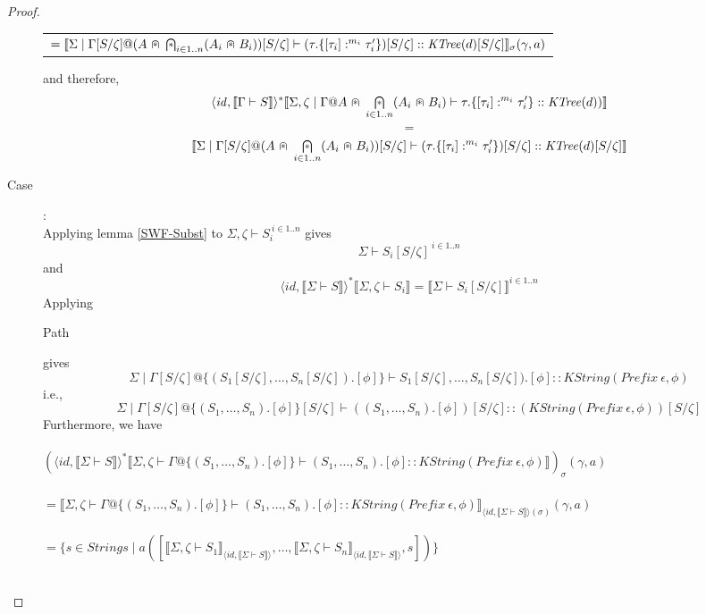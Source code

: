 \documentclass{article}
\newcommand{\sem}[1]{\llbracket #1 \rrbracket}
\newcommand{\capdot}{~\stackinset{c}{}{c}{}{\scalebox{0.8}{$\ast$}}{$\cap$}~}
\newcommand{\bigcapdot}{\mathop{\stackinset{c}{}{c}{}{\scalebox{0.8}{$\ast$}}{$\bigcap$}}}
\begin{document}
\begin{proof}
\begin{description}
\begin{center}
\begin{tabular}{l}
$= \sem{\Sigma \mid \Gamma[S/\zeta] @ (A \capdot \bigcapdot_{i \in 1..n} (A_i \capdot B_i))[S/\zeta] \vdash (\tau.\{ [\tau_i] :^{m_i} \tau'_i \})[S/\zeta] :: \mathit{KTree}(d)[S/\zeta]  }_{\sigma}(\gamma,a)  $
\end{tabular}
\end{center}
and therefore,
$$\langle \mathit{id}, \sem{\Gamma \vdash S} \rangle^* \sem{\Sigma,\zeta \mid \Gamma @ A \capdot \bigcapdot_{i \in 1..n} (A_i \capdot B_i) \vdash \tau.\{ [\tau_i] :^{m_i} \tau_i' \} :: \mathit{KTree}(d))}$$ $$=$$ $$\sem{\Sigma \mid \Gamma[S/\zeta] @ (A \capdot \bigcapdot_{i \in 1..n} (A_i \capdot B_i))[S/\zeta] \vdash (\tau.\{ [\tau_i] :^{m_i} \tau'_i \})[S/\zeta] :: \mathit{KTree}(d)[S/\zeta]}$$
\item[Case \sc{Path}]:~\\
Applying lemma \ref{SWF-Subst} to $\Sigma,\zeta \vdash S_i^{~i \in 1..n}$ gives $$\Sigma \vdash S_i[S/\zeta]^{~i \in 1..n}$$ and $$\langle \mathit{id}, \sem{\Sigma \vdash S} \rangle^* \sem{\Sigma, \zeta \vdash S_i} = \sem{\Sigma \vdash S_i[S/\zeta]}^{i \in 1..n}$$ 
Applying \begin{sc}Path\end{sc} gives 
$$\Sigma \mid \Gamma[S/\zeta] @ \{ (S_1[S/\zeta],\ldots,S_n[S/\zeta]).[\phi] \} \vdash S_1[S/\zeta],\ldots,S_n[S/\zeta]).[\phi] :: \mathit{KString}(\mathit{Prefix}~\epsilon,\phi)$$
i.e.,
$$\Sigma \mid \Gamma[S/\zeta] @ \{ (S_1,\ldots,S_n).[\phi] \}[S/\zeta] \vdash ((S_1,\ldots,S_n).[\phi])[S/\zeta] :: (\mathit{KString}(\mathit{Prefix}~\epsilon,\phi))[S/\zeta]$$
Furthermore, we have\\~\\
$(\langle \mathit{id}, \sem{\Sigma \vdash S} \rangle^* \sem{\Sigma,\zeta \vdash \Gamma @ \{ (S_1, \ldots, S_n).[\phi] \} \vdash (S_1, \ldots, S_n).[\phi] :: \mathit{KString(\mathit{Prefix}~\epsilon,\phi)} })_{\sigma}(\gamma,a)$\\~\\
$= \sem{\Sigma,\zeta \vdash \Gamma @ \{ (S_1, \ldots, S_n).[\phi] \} \vdash (S_1, \ldots, S_n).[\phi] :: \mathit{KString(\mathit{Prefix}~\epsilon,\phi)}}_{\langle \mathit{id}, \sem{\Sigma \vdash S} \rangle(\sigma)}(\gamma,a)$\\~\\
$= \{ s \in \mathit{Strings} \mid a([\sem{\Sigma,\zeta \vdash S_1}_{\langle \mathit{id}, \sem{\Sigma \vdash S} \rangle}, \ldots, \sem{\Sigma,\zeta \vdash S_n}_{\langle \mathit{id}, \sem{\Sigma \vdash S} \rangle}, s])\}$\\~\\

\end{description}
\end{proof}
\end{document}
